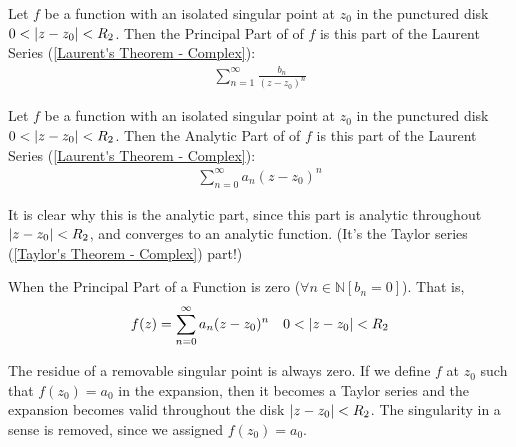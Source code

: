 \documentclass[12pt, english]{book}
\begin{document}
	\begin{definition}
		\label{Principal Part of a Function Definition - Complex}
		Let \(f\) be a function with an isolated singular point at \(z_0\) in the punctured disk \(0 < \abs{z-z_0}<R_2\). 
		Then the Principal Part of of \(f\) is this part of the Laurent Series (\cref{Laurent's Theorem - Complex}):
		\begin{align*}
			\sum_{n=1}^{\infty} \frac{b_n}{(z-z_0)^n}
		\end{align*}
	\end{definition}

	\begin{definition}
		\label{Analytic Part of a Function Definition - Complex}
		Let \(f\) be a function with an isolated singular point at \(z_0\) in the punctured disk \(0 < \abs{z-z_0}<R_2\).
		Then the Analytic Part of of \(f\) is this part of the Laurent Series (\cref{Laurent's Theorem - Complex}):
		\begin{align*}
			\sum_{n=0}^{\infty} a_n (z-z_0)^n
		\end{align*}
	\end{definition}
	
	It is clear why this is the analytic part, since this part is analytic throughout \(\abs{z-z_0}<R_2\), and converges to an analytic function. (It's the Taylor series (\cref{Taylor's Theorem - Complex}) part!)
	
	\begin{definition}
		\label{Removable Singular Points Definition - Complex}
		When the Principal Part of a Function is zero (\(\forall n \in \mathbb{N}[b_n = 0]\)). That is, 
		\begin{align*}
			f(z) &= \sum_{n=0}^{\infty} a_n (z-z_0)^n	& 0 < \abs{z-z_0}<R_2
		\end{align*}
	\end{definition}
	
	The residue of a removable singular point is always zero. If we define \(f\) at \(z_0\) such that \(f(z_0) = a_0\) in the expansion, then it becomes a Taylor series and the expansion becomes valid throughout the disk \(\abs{z-z_0}<R_2\). The singularity in a sense is removed, since we assigned \(f(z_0) = a_0\).
	
\end{document}
